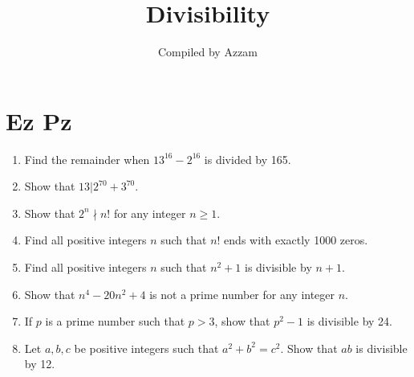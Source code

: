 \documentclass[11pt]{scrartcl}
\title{Divisibility}
\author{Compiled by Azzam}
\begin{document}
\maketitle
\section{Ez Pz}
\begin{enumerate}
    \item Find the remainder when $13^{16} - 2^{16}$ is divided by 165.

    \item Show that $13 | 2^{70} + 3^{70}$.

    \item Show that $2^n \nmid n!$ for any integer $n \ge 1$.

    \item Find all positive integers $n$ such that $n!$ ends with exactly 1000 zeros.

    \item Find all positive integers $n$ such that $n^2+1$ is divisible by $n+1$.

    \item Show that $n^4 - 20n^2 + 4$ is not a prime number for any integer $n$.

    \item If $p$ is a prime number such that $p > 3$, show that $p^2-1$ is divisible by 24.

    \item Let $a, b, c$ be positive integers such that $a^2+b^2=c^2$. Show that $ab$ is divisible by 12.
\end{enumerate}
\end{document}
